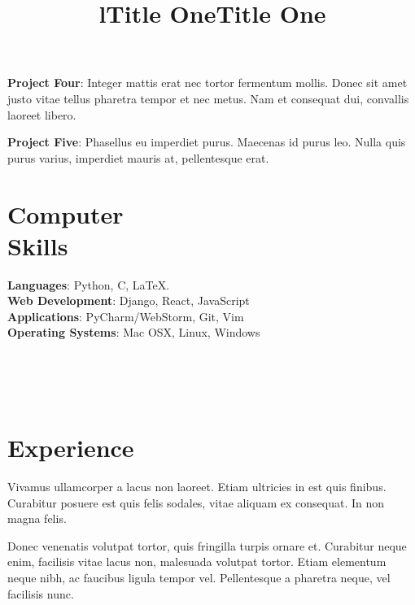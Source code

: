 \documentclass[margin]{res}
\begin{document}
\begin{resume}
      \par
      \textbf{Project Four}: 
      Integer mattis erat nec tortor fermentum mollis. Donec sit amet justo vitae 
      tellus pharetra tempor et nec metus. Nam et consequat dui, convallis laoreet 
      libero. 

      \par
      \textbf{Project Five}: 
      Phasellus eu imperdiet purus. Maecenas id purus leo. Nulla quis purus varius, 
      imperdiet mauris at, pellentesque erat. 

    \section{Computer\\Skills}

      \textbf{Languages}: Python, C, \LaTeX.
      \\
      \textbf{Web Development}: Django, React, JavaScript
      \\
      \textbf{Applications}: PyCharm/WebStorm, Git, Vim
      \\
      \textbf{Operating Systems}: 
      Mac OSX, Linux, Windows

    \begin{format}
      \title{l}\\
      \\
      \body\\
    \end{format}

    \section{Experience}
      \title{\textbf{Title One}}
      \begin{position}
        Vivamus ullamcorper a lacus non laoreet. Etiam ultricies in est quis finibus. 
        Curabitur posuere est quis felis sodales, vitae aliquam ex consequat. In non 
        magna felis.
      \end{position}

      \title{\textbf{Title One}}
      \begin{position}
        Donec venenatis volutpat tortor, quis fringilla turpis ornare et. Curabitur 
        neque enim, facilisis vitae lacus non, malesuada volutpat tortor. Etiam 
        elementum neque nibh, ac faucibus ligula tempor vel. Pellentesque a pharetra 
        neque, vel facilisis nunc.
      \end{position}


\end{resume}
\end{document}
